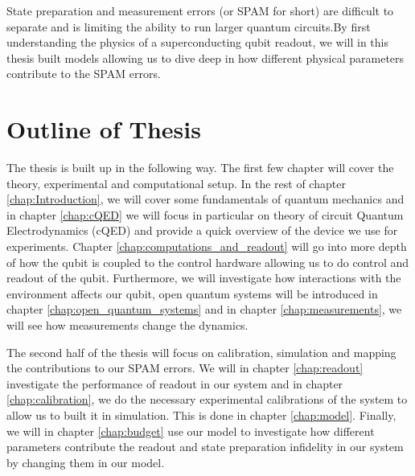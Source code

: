 State preparation and measurement errors (or SPAM for short) are difficult to separate and is limiting the ability to run larger quantum circuits.By first understanding the physics of a superconducting qubit readout, we will in this thesis built models allowing us to dive deep in how different physical parameters contribute to the SPAM errors.



\newpage
\section{Outline of Thesis}
The thesis is built up in the following way. The first few chapter will cover the theory, experimental and computational setup. In the rest of chapter \ref{chap:Introduction}, we will cover some fundamentals of quantum mechanics and in chapter \ref{chap:cQED} we will focus in particular on theory of circuit Quantum Electrodynamics (cQED) and provide a quick overview of the device we use for experiments. Chapter \ref{chap:computations_and_readout} will go into more depth of how the qubit is coupled to the control hardware allowing us to do control and readout of the qubit. Furthermore, we will investigate how interactions with the environment affects our qubit, open quantum systems will be introduced in chapter \ref{chap:open_quantum_systems} and in chapter \ref{chap:measurements}, we will see how measurements change the dynamics.

The second half of the thesis will focus on calibration, simulation and mapping the contributions to our SPAM errors. We will in chapter \ref{chap:readout} investigate the performance of readout in our system and in chapter \ref{chap:calibration}, we do the necessary experimental calibrations of the system to allow us to built it in simulation. This is done in chapter \ref{chap:model}. Finally, we will in chapter \ref{chap:budget} use our model to investigate how different parameters contribute the readout and state preparation infidelity in our system by changing them in our model.  



